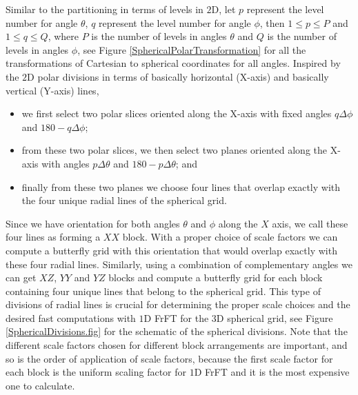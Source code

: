 \documentclass{UCF_ETD}
\begin{document}
 Similar to the partitioning in terms of levels in  $2$D, let $p$ represent the level number for angle $\theta $, $q$ represent the level number for angle $\phi$,
 then $1 \leq p \leq P$ and
 $1 \leq q \leq Q$, where $P$  is the number of levels in angles $\theta $ and $Q$ is the number of levels in angles $\phi$, see Figure \ref{SphericalPolarTransformation} for all the transformations of Cartesian to spherical coordinates for all angles. Inspired by the $2$D polar divisions in terms of {basically horizontal} (X-axis) and {basically vertical} (Y-axis) lines,
  \begin{itemize}
  \item we first select two polar slices oriented along the X-axis with fixed angles $q\Delta \phi$ and $180-q\Delta \phi$;
      \item  from these two polar slices, we then select two planes oriented along the X-axis with angles $p\Delta \theta$ and $180 - p\Delta \theta$; and
      \item finally from these two planes we choose four lines that overlap exactly with the four unique radial lines of the spherical grid.
  \end{itemize}
  Since we have orientation for both angles $\theta$ and $\phi$ along  the $X$ axis, we call these four lines as forming a $XX$ block. With a proper choice of scale factors we can compute a butterfly grid with this orientation that would overlap exactly with these four radial lines. Similarly, using a combination of complementary angles we can get $XZ$, $YY$ and $YZ$ blocks and compute a butterfly grid for each block containing four unique lines that belong to the spherical grid. This type of divisions of radial lines is crucial for determining the proper scale choices and the desired fast computations with $1$D FrFT for the $3$D spherical grid, see Figure \ref{SphericalDivisions.fig} for the schematic of the spherical divisions. Note that the different scale factors chosen for different block arrangements are important, and so is the order of application of scale factors, because the first scale factor for each block is the uniform scaling factor for $1$D FrFT and it is the most expensive one to calculate.
\end{document}
